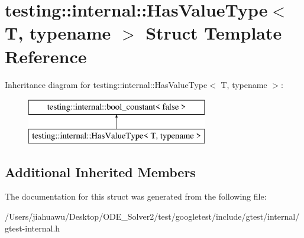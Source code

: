 \hypertarget{structtesting_1_1internal_1_1_has_value_type}{}\section{testing\+:\+:internal\+:\+:Has\+Value\+Type$<$ T, typename $>$ Struct Template Reference}
\label{structtesting_1_1internal_1_1_has_value_type}
Inheritance diagram for testing\+:\+:internal\+:\+:Has\+Value\+Type$<$ T, typename $>$\+:\begin{figure}[H]
\begin{center}
\leavevmode
\includegraphics[height=2.000000cm]{structtesting_1_1internal_1_1_has_value_type}
\end{center}
\end{figure}
\subsection*{Additional Inherited Members}


The documentation for this struct was generated from the following file\+:\begin{DoxyCompactItemize}
\item 
/\+Users/jiahuawu/\+Desktop/\+O\+D\+E\+\_\+\+Solver2/test/googletest/include/gtest/internal/gtest-\/internal.\+h\end{DoxyCompactItemize}
